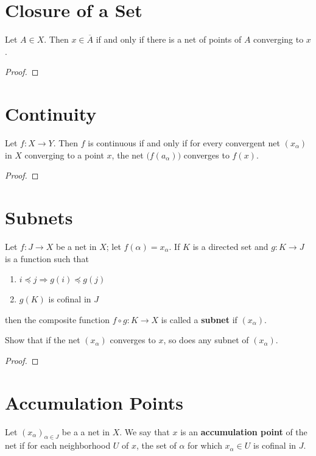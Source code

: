 \documentclass[12pt]{article}
\begin{document}
\section{Closure of a Set}
\begin{thm}
    Let $A \in X$. Then $x \in \overline A$ if and only if there is a net of points of $A$ converging to $x$.
\end{thm}
\begin{proof}
\end{proof}

\section{Continuity}
\begin{thm}
    Let $f: X \to Y$. Then $f$ is continuous if and only if for every convergent net $(x_\alpha)$ in $X$ converging to a point $x$, the net $\big(f(a_\alpha)\big)$ converges to $f(x)$.
\end{thm}
\begin{proof}
\end{proof}

\section{Subnets}
\begin{defn}
    Let $f: J \to X$ be a net in $X$; let $f(\alpha) = x_\alpha$. If $K$ is a directed set and $g:K \to J$ is a function such that
    \begin{enumerate}
        \item $i \preceq j \Rightarrow g(i) \preceq g(j)$
        \item $g(K)$ is cofinal in $J$
    \end{enumerate}
    then the composite function $f \circ g : K \to X$ is called a \textbf{subnet} if $(x_\alpha)$.
\end{defn}

Show that if the net $(x_\alpha)$ converges to $x$, so does any subnet of $(x_\alpha)$.
\begin{proof}
\end{proof}

\section{Accumulation Points}
\begin{defn}
    Let ${(x_\alpha)}_{\alpha\in J}$ be a a net in $X$. We say that $x$ is an \textbf{accumulation point} of the net if for each neighborhood $U$ of $x$, the set of $\alpha$ for which $x_\alpha \in U$ is cofinal in $J$.
\end{defn}
\end{document}

